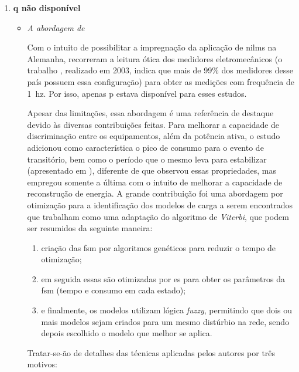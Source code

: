 \begin{enumerate}[label=\textbf{1.\arabic*},wide=\parindent]
\begin{enumerate}[label*=.\textbf{\arabic*},wide=\parindent]
\item \textbf{\Acrlong{q} não disponível}

\begin{itemize}[wide=\parindent]
\item \emph{A abordagem de 
\citeauthor*{nilm_baranski_genetic_base_2003_19}}

Com o intuito de possibilitar a impregnação da aplicação de \glspl{nilm}
na Alemanha, \citet*{nilm_baranski_genetic_base_2003_19,
nilm_baranski_genetic_detalhado_2004_20,nilm_baranski_summary_2004_21}
recorreram a leitura ótica dos medidores eletromecânicos
(o trabalho \cite{nilm_baranski_genetic_base_2003_19}, realizado em
2003, indica que mais de 99\% dos medidores desse país possuem essa
configuração) para obter as medições com frequência de
1~\acs{hz}. Por isso, apenas \gls{p} estava disponível para esses
estudos. 

Apesar das limitações, essa abordagem é uma referência de destaque
devido às diversas contribuições feitas. Para melhorar a capacidade de
discriminação entre os equipamentos, além da potência ativa, o estudo
adicionou como característica o pico de consumo para o evento de
transitório, bem como o período que o mesmo leva para estabilizar
(apresentado em \cite{nilm_baranski_genetic_detalhado_2004_20}),
diferente de \cite{nilm_cole_data_extraction_1998_14,
nilm_cole_extra_info_surge_1998_15} que observou essas propriedades,
mas empregou somente a última com o intuito de melhorar a
capacidade de reconstrução de energia. A grande contribuição foi uma
abordagem por otimização para a identificação dos modelos de carga a
serem encontrados que trabalham como uma adaptação do algoritmo de
\emph{Viterbi}, que podem ser resumidos da seguinte maneira:

\begin{enumerate}
\item criação das \gls{fsm} por algoritmos genéticos
para reduzir o tempo de otimização; 
\item em seguida essas são otimizadas por \gls{es} para obter os
parâmetros da \gls{fsm} (tempo e consumo em cada estado); 
\item e finalmente, os modelos utilizam lógica \emph{fuzzy}, permitindo que
dois ou mais modelos sejam criados para um mesmo distúrbio na rede,
sendo depois escolhido o modelo que melhor se aplica.
\end{enumerate}

Tratar-se-ão de detalhes das técnicas aplicadas pelos autores por três 
motivos:


\end{itemize}
\end{enumerate}
\end{enumerate}
